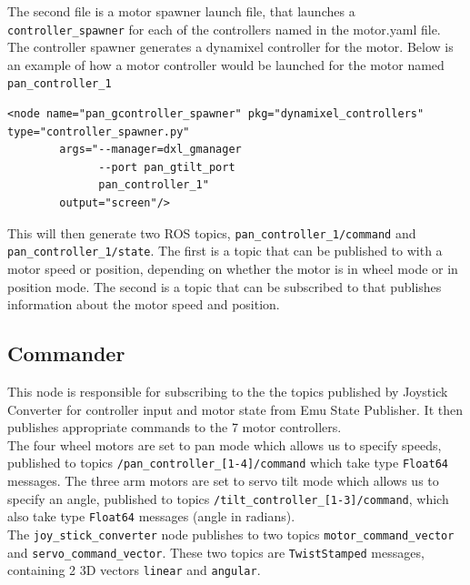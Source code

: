 \documentclass[titlepage,12pt,a4paper]{article}
\begin{document}
\noindent The second file is a motor spawner launch file, that launches a \texttt{controller\_spawner} for each of the controllers named in the motor.yaml file. The controller spawner generates a dynamixel controller for the motor. Below is an example of how a motor controller would be launched for the motor named \texttt{pan\_controller\_1}\\

\begin{lstlisting}
<node name="pan_gcontroller_spawner" pkg="dynamixel_controllers" type="controller_spawner.py"
        args="--manager=dxl_gmanager
              --port pan_gtilt_port
              pan_controller_1"
        output="screen"/>
\end{lstlisting}


\noindent This will then generate two ROS topics, \texttt{pan\_controller\_1/command} and\\ \noindent\texttt{pan\_controller\_1/state}. The first is a topic that can be published to with a motor speed or position, depending on whether the motor is in wheel mode or in position mode. The second is a topic that can be subscribed to that publishes information about the motor speed and position.

\newpage
\subsection{Commander}
This node is responsible for subscribing to the the topics published by Joystick Converter for controller input and motor state from Emu State Publisher. It then publishes appropriate commands to the 7 motor controllers.\\

\noindent The four wheel motors are set to pan mode which allows us to specify speeds, published to topics \texttt{/pan\_controller\_[1-4]/command} which take type \texttt{Float64} messages. The three arm motors are set to servo tilt mode which allows us to specify an angle, published to topics \texttt{/tilt\_controller\_[1-3]/command}, which also take type \texttt{Float64} messages (angle in radians).\\

\noindent The \texttt{joy\_stick\_converter} node publishes to two topics \texttt{motor\_command\_vector} and \texttt{servo\_command\_vector}. These two topics are \texttt{TwistStamped} messages, containing 2 3D vectors \texttt{linear} and \texttt{angular}.\\
\end{document}
